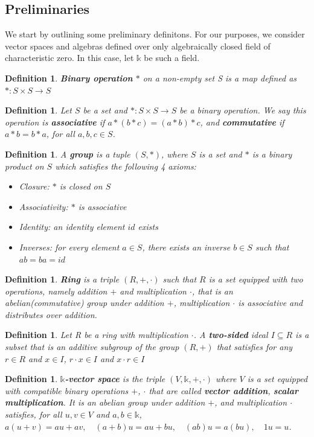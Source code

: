 \documentclass[12pt]{article}
\newtheorem{definition}[theorem]{Definition}
\numberwithin{theorem}{section}
\numberwithin{equation}{theorem}
\newcommand{\kk}{\mathds{k}}
\begin{document}
\subsection{Preliminaries}
We start by outlining some preliminary definitons.
For our purposes, we consider vector spaces and algebras defined over only algebraically closed field of characteristic zero. In this case, let $\kk$ be such a field.
\begin{definition}
    \textbf{Binary operation} $*$ on a non-empty set S is a map defined as $ * : S \times S \to S$ 
\end{definition}
\begin{definition}
    Let $S$ be a set and $* : S \times S \to S$ be a binary operation. We say this operation is \textbf{associative} if $a*(b*c) = (a*b)*c$, and \textbf{commutative} if $a*b = b*a$, for all $a, b, c \in S$.
\end{definition}
\begin{definition}
    A \textbf{group} is a tuple $(S, *)$, where $S$ is a set and $*$ is a binary product on $S$ which satisfies the following 4 axioms:
    \begin{itemize}
        \item Closure: $*$ is closed on $S$
        \item Associativity: $*$ is associative
        \item Identity: an identity element $id$ exists
        \item Inverses: for every element $a \in S$, there exists an inverse $b \in S$ such that $ab = ba = id$
    \end{itemize}
\end{definition}
\begin{definition}
    \textbf{Ring} is a triple $(R, +, \cdot)$ such that $R$ is a set equipped with two operations, namely addition $+$ and multiplication $\cdot$, that is an abelian(commutative) group under addition $+$, multiplication $\cdot$ is associative and distributes over addition.
\end{definition}
\begin{definition}
    Let R be a ring with multiplication $\cdot$. A \textbf{two-sided} ideal $I \subseteq R$ is a subset that is an additive subgroup of the group $(R, +)$ that satisfies for any $r \in R$ and $x \in I$, $r \cdot x \in I$ and $x \cdot r \in I$
\end{definition}
\begin{definition}
    $\kk$\textbf{-vector space} is the triple $(V, \kk, +, \cdot)$ where $V$ is a set equipped with compatible binary operations $+$, $\cdot$ that are called \textbf{vector addition}, \textbf{scalar multiplication}. It is an abelian group under addition $+$, and multiplication $\cdot$ satisfies, for all $u, v \in V$ and $a, b \in \kk$, $a(u+v) = au + av,\quad (a+b)u = au + bu,\quad (ab)u = a(bu),\quad 1u = u$. 
\end{definition}
\end{document}
